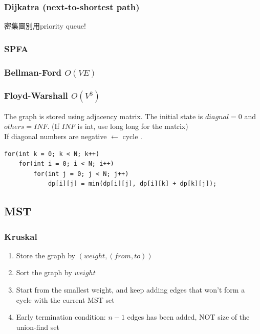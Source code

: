 \documentclass[10pt,oneside]{article}
\begin{document}
\begin{landscape}
\begin{multicols}{2}
\subsubsection{Dijkatra (next-to-shortest path)}
密集圖別用priority queue!

\subsubsection{SPFA}

\subsubsection{Bellman-Ford $O(VE)$}

\subsubsection{Floyd-Warshall $O(V^3)$}

The graph is stored using adjacency matrix. The initial state is $diagnal = 0$ and $others = INF$. (If $INF$ is int, use long long for the matrix)\\
If diagonal numbers are negative $\leftarrow$ cycle . \\

\begin{verbatim}
for(int k = 0; k < N; k++)
    for(int i = 0; i < N; i++)
        for(int j = 0; j < N; j++)
            dp[i][j] = min(dp[i][j], dp[i][k] + dp[k][j]);
\end{verbatim}

\subsection{MST}

\subsubsection{Kruskal}

\begin{enumerate}
	\item Store the graph by $(weight, (from , to))$
	\item Sort the graph by $weight$ 
	\item Start from the smallest weight, and keep adding edges that won't form a cycle with the current MST set
	\item Early termination condition: $n - 1$ edges has been added, NOT size of the union-find set
\end{enumerate}


\end{multicols}
\end{landscape}
\end{document}

